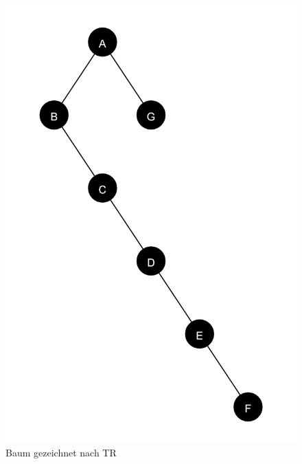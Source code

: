 \begin{figure}[ht]
    \centering
    \begin{minipage}[t]{0.45\linewidth}
        \centering
        \includegraphics[scale = 0.075]{abbildungen/tree_spiegel_1_a3}
        \caption[]{Baum gezeichnet nach TR}
    \end{minipage}
    \hfill
    \begin{minipage}[t]{0.45\linewidth}
        \centering

\end{minipage}
\end{figure}
